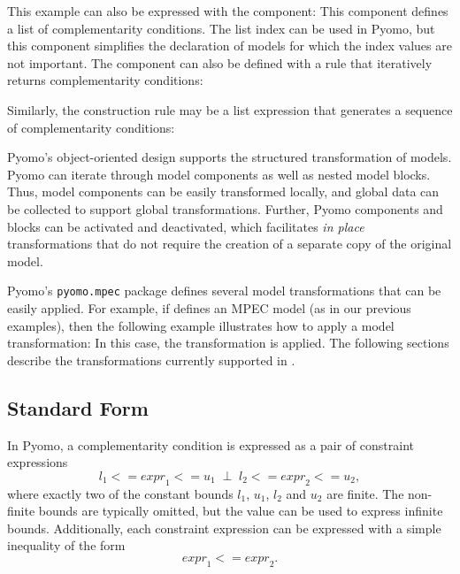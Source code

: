 This example can also be expressed with the 
 component:
This component defines a list of complementarity conditions.  The list index can be 
used in Pyomo, but this component simplifies the declaration of models for which 
the index values are not important.  The  
component can also be defined with a rule that iteratively returns complementarity conditions:

Similarly, the construction rule may be a list expression that
generates a sequence of complementarity conditions:
\fi

\label{sec:transformations}

Pyomo's object-oriented design supports the structured transformation
of models.  Pyomo can iterate through model components as well as
nested model blocks.  Thus, model components can be easily transformed
locally, and global data can be collected to support global
transformations.  Further, Pyomo components and blocks can be
activated and deactivated, which facilitates \textit{in place}
transformations that do not require the creation of a separate
copy of the original model.

Pyomo's \texttt{pyomo.mpec} package defines several model transformations
that can be easily applied.  For example, if  defines
an MPEC model (as in our previous examples), then the following
example illustrates how to apply a model transformation:
In this case, the  transformation is applied.
The following sections describe the transformations currently
supported in .
\fi

\subsection{Standard Form}

In Pyomo, a complementarity condition is expressed as a pair of
constraint expressions
\[
{l}_1 <= {expr}_1 <= {u}_1 \;\;\bot\;\; {l}_2 <= {expr}_2 <= {u}_2,
\]
where exactly two of the constant bounds $l_1$, $u_1$, $l_2$ and
$u_2$ are finite.  The non-finite bounds are typically omitted, but
the value  can be used to express infinite bounds.
Additionally, each constraint expression can be expressed with a
simple inequality of the form
\[
{expr}_1 <= {expr}_2.
\]

